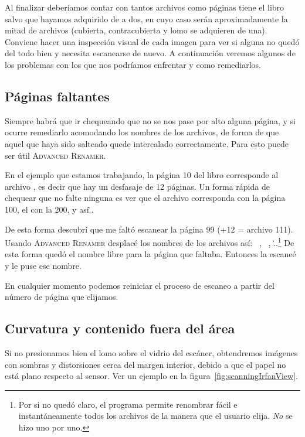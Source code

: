 \documentclass[%
	a5paper,
	10pt,
	twoside,
	openright,
	final,
]{memoir}
\begin{document}
{	Al finalizar deberíamos contar con tantos archivos como páginas tiene el libro salvo que hayamos adquirido de a dos, en cuyo caso serán aproximadamente la mitad de archivos (cubierta, contracubierta y lomo se adquieren de una). Conviene hacer una inspección visual de cada imagen para ver si alguna no quedó del todo bien y necesita escanearse de nuevo. A continuación veremos algunos de los problemas con los que nos podríamos enfrentar y como remediarlos.

	\subsection{Páginas faltantes} Siempre habrá que ir chequeando que no se nos pase por alto alguna página, y si ocurre remediarlo acomodando los nombres de los archivos, de forma de que aquel que haya sido salteado quede intercalado correctamente. Para esto puede ser útil \textsc{Advanced Renamer}.

	En el ejemplo que estamos trabajando, la página 10 del libro corresponde al archivo , es decir que hay un desfasaje de 12 páginas. Un forma rápida de chequear que no falte ninguna es ver que el archivo  corresponda con la página 100, el  con la 200, y así\...

	De esta forma descubrí que me faltó escanear la página 99 (+12 = archivo 111). Usando \textsc{Advanced Renamer} desplacé los nombres de los archivos así:  \faLongArrowAltRight\ ,  \faLongArrowAltRight\ , \...\footnote{Por si no quedó claro, el programa permite renombrar fácil e instantáneamente todos los archivos de la manera que el usuario elija. \emph{No} se hizo uno por uno.} De esta forma quedó el nombre  libre para la página que faltaba. Entonces la escaneé y le puse ese nombre.

	En cualquier momento podemos reiniciar el proceso de escaneo a partir del número de página que elijamos.

	\subsection{Curvatura y contenido fuera del área} Si no presionamos bien el lomo sobre el vidrio del escáner, obtendremos imágenes con sombras y distorsiones cerca del margen interior, debido a que el papel no está plano respecto al sensor. Ver un ejemplo en la figura~\ref{fig:scanningIrfanView}.

}
\end{document}
